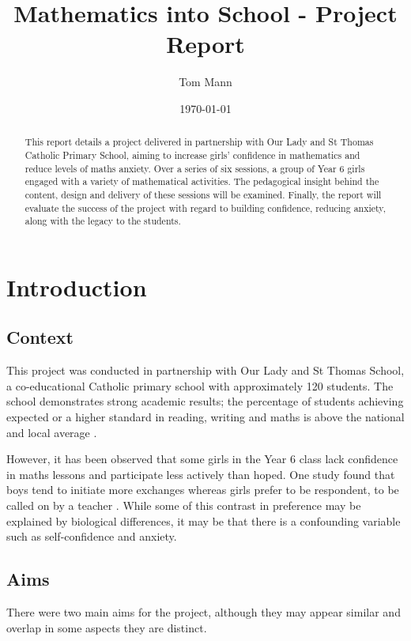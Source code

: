 \documentclass[11pt, a4paper, notitlepage]{article}
\title{Mathematics into School - Project Report}
\author{Tom Mann}
\date{\today}
\begin{document}
\maketitle

\begin{abstract}
    This report details a project delivered in partnership with Our Lady and St Thomas Catholic Primary School, aiming to increase girls' confidence in mathematics and reduce levels of maths anxiety. Over a series of six sessions, a group of Year 6 girls engaged with a variety of mathematical activities. The pedagogical insight behind the content, design and delivery of these sessions will be examined. Finally, the report will evaluate the success of the project with regard to building confidence, reducing anxiety, along with the legacy to the students.
\end{abstract}


\tableofcontents

\clearpage

\section{Introduction}

\subsection{Context}
This project was conducted in partnership with Our Lady and St Thomas School, a  co-educational Catholic primary school with approximately 120 students. The school demonstrates strong academic results; the percentage of students achieving expected or a higher standard in reading, writing and maths is above the national and local average \cite{OLST_stats}.
\par
However, it has been observed that some girls in the Year 6 class lack confidence in maths lessons and participate less actively than hoped. One study found that boys tend to initiate more exchanges whereas girls prefer to be respondent, to be called on by a teacher \cite{Rashid:2012}. While some of this contrast in preference may be explained by biological differences, it may be that there is a confounding variable such as self-confidence and anxiety. 


\subsection{Aims}
There were two main aims for the project, although they may appear similar and overlap in some aspects they are distinct.
\end{document}
